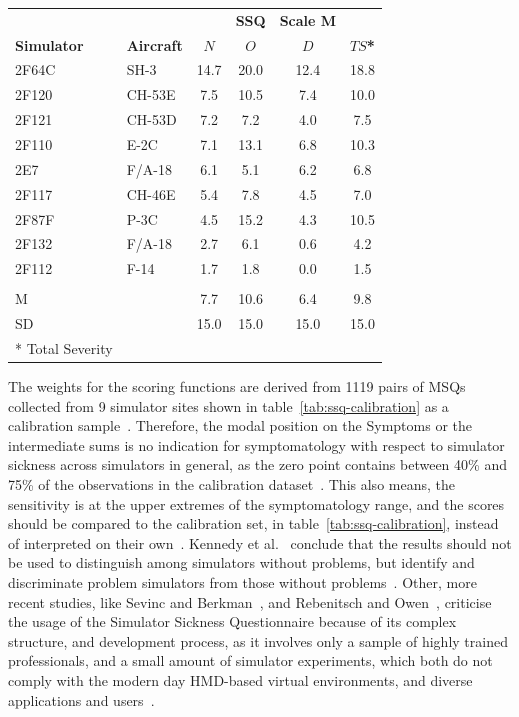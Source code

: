 \begin{center}
    \begin{tabular}{ l l c c c c}
        \toprule
         & & & \textbf{SSQ} & \textbf{Scale M} & \\
        \textbf{Simulator} & \textbf{Aircraft} & \textbf{$N$} & \textbf{$O$} & \textbf{$D$} & \textbf{$TS$*} \\
        \midrule
        2F64C & SH-3   & 14.7 & 20.0 & 12.4 & 18.8 \\
        2F120 & CH-53E & 7.5  & 10.5 & 7.4  & 10.0 \\
        2F121 & CH-53D & 7.2  & 7.2  & 4.0  & 7.5  \\
        2F110 & E-2C   & 7.1  & 13.1 & 6.8  & 10.3 \\
        2E7   & F/A-18 & 6.1  & 5.1  & 6.2  & 6.8  \\
        2F117 & CH-46E & 5.4  & 7.8  & 4.5  & 7.0  \\
        2F87F & P-3C   & 4.5  & 15.2 & 4.3  & 10.5 \\
        2F132 & F/A-18 & 2.7  & 6.1  & 0.6  & 4.2  \\
        2F112 & F-14   & 1.7  & 1.8  & 0.0  & 1.5  \\
              &        &      &      &      &      \\
        M     &        & 7.7  & 10.6 & 6.4  & 9.8  \\
        SD    &        & 15.0 & 15.0 & 15.0 & 15.0 \\
        \bottomrule
        * Total Severity & & & & & \\
    \end{tabular}
    \label{tab:ssq-calibration}
\end{center}
The weights for the scoring functions are derived from 1119 pairs of MSQs collected from 9 simulator sites
shown in table~\ref{tab:ssq-calibration} as a calibration sample~\cite{Kennedy1993}.
Therefore, the modal position on the Symptoms or the intermediate sums is no indication for symptomatology with
respect to simulator sickness across simulators in general, as the zero point contains between 40\% and 75\% of the
observations in the calibration dataset~\cite{Kennedy1993}.
This also means, the sensitivity is at the upper extremes of the symptomatology range, and the scores should be
compared to the calibration set, in table~\ref{tab:ssq-calibration}, instead of
interpreted on their own~\cite{Kennedy1993}.
Kennedy et al.~\cite{Kennedy1993} conclude that the results should not be used to distinguish among simulators without
problems, but identify and discriminate problem simulators from those without problems~\cite{Kennedy1993}.
Other, more recent studies, like Sevinc and Berkman~\cite{Sevinc2020}, and Rebenitsch and Owen~\cite{Rebenitsch2016},
criticise the usage of the Simulator Sickness Questionnaire because of its complex structure, and development
process, as it involves only a sample of highly trained professionals, and a small amount of simulator experiments,
which both do not comply with the modern day HMD-based virtual environments, and diverse applications
and users~\cite{Sevinc2020}.

